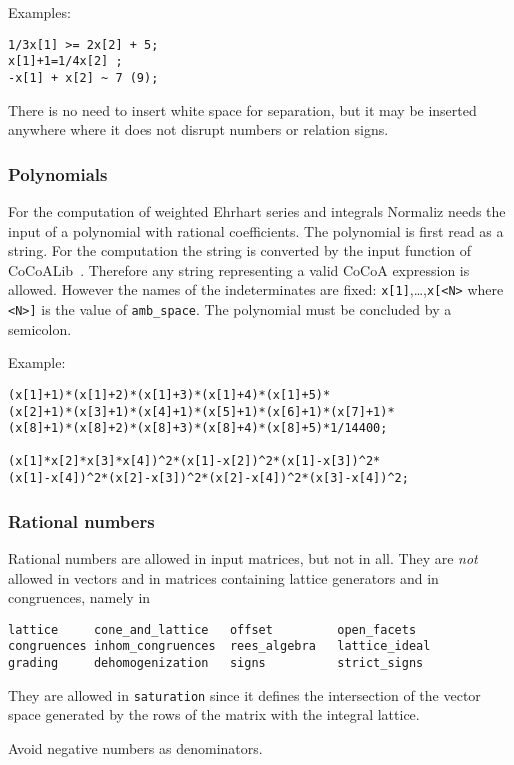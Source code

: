 \documentclass[12pt,a4paper]{scrartcl}
\theoremstyle{definition}
\begin{document}
Examples:
\begin{Verbatim}
1/3x[1] >= 2x[2] + 5;
x[1]+1=1/4x[2] ;
-x[1] + x[2] ~ 7 (9);
\end{Verbatim}

There is no need to insert white space for separation, but it may be inserted anywhere where it does not disrupt numbers or relation signs.

\subsubsection{Polynomials}\label{poly_input}

For the computation of weighted Ehrhart series and integrals Normaliz needs the input of a polynomial with rational coefficients. The polynomial is first read as a string. For the computation the string is converted by the input function of CoCoALib~\cite{CoCoA}. Therefore any string representing a valid CoCoA expression is allowed. However the names of the indeterminates are fixed: \verb|x[1]|,\dots,\verb|x[<N>| where \verb|<N>]| is the value of \verb|amb_space|. The polynomial must be concluded by a semicolon.

Example:
\begin{Verbatim}
(x[1]+1)*(x[1]+2)*(x[1]+3)*(x[1]+4)*(x[1]+5)*
(x[2]+1)*(x[3]+1)*(x[4]+1)*(x[5]+1)*(x[6]+1)*(x[7]+1)*
(x[8]+1)*(x[8]+2)*(x[8]+3)*(x[8]+4)*(x[8]+5)*1/14400;

(x[1]*x[2]*x[3]*x[4])^2*(x[1]-x[2])^2*(x[1]-x[3])^2*
(x[1]-x[4])^2*(x[2]-x[3])^2*(x[2]-x[4])^2*(x[3]-x[4])^2;
\end{Verbatim}

\subsubsection{Rational numbers}\label{rational_input}

Rational numbers are allowed in input matrices, but not in all. They are \emph{not} allowed in vectors and in matrices containing lattice generators and in congruences, namely in
\begin{Verbatim}
lattice     cone_and_lattice   offset         open_facets
congruences inhom_congruences  rees_algebra   lattice_ideal
grading     dehomogenization   signs          strict_signs
\end{Verbatim}
They are allowed in \verb|saturation| since it defines the intersection of the vector space generated by the rows of the matrix with the integral lattice.

Avoid negative numbers as denominators.
\end{document}
